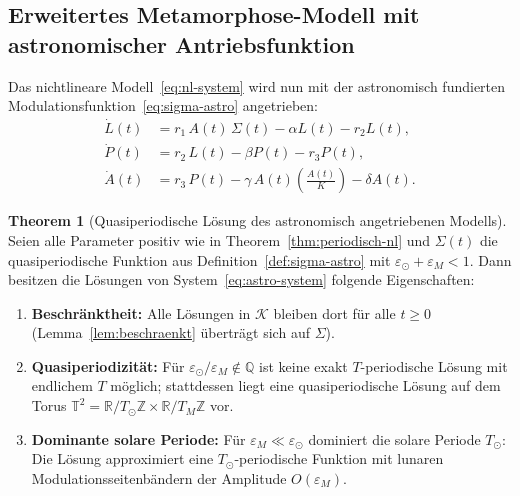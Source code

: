 ﻿\documentclass[12pt, a4paper]{article}
\theoremstyle{definition}
\newtheorem{theorem}{Theorem}[section]
\newcommand{\R}{\mathbb{R}}
\newcommand{\Z}{\mathbb{Z}}
\newcommand{\Q}{\mathbb{Q}}
\begin{document}
\subsection{Erweitertes Metamorphose-Modell mit astronomischer Antriebsfunktion}

Das nichtlineare Modell~\eqref{eq:nl-system} wird nun mit der astronomisch
fundierten Modulationsfunktion~\eqref{eq:sigma-astro} angetrieben:
\begin{subequations}\label{eq:astro-system}
\begin{align}
  \dot{L}(t) &= r_1\,A(t)\,\Sigma(t) - \alpha L(t) - r_2 L(t), \label{eq:astro-L}\\
  \dot{P}(t) &= r_2\,L(t) - \beta P(t) - r_3 P(t), \label{eq:astro-P}\\
  \dot{A}(t) &= r_3\,P(t) - \gamma\,A(t)\!\left(\frac{A(t)}{K}\right) - \delta A(t). \label{eq:astro-A}
\end{align}
\end{subequations}

\begin{theorem}[Quasiperiodische Lösung des astronomisch angetriebenen Modells]\label{thm:quasiperiodisch}
Seien alle Parameter positiv wie in Theorem~\ref{thm:periodisch-nl} und
$\Sigma(t)$ die quasiperiodische Funktion aus Definition~\ref{def:sigma-astro}
mit $\varepsilon_{\odot} + \varepsilon_M < 1$. Dann besitzen die Lösungen von
System~\eqref{eq:astro-system} folgende Eigenschaften:
\begin{enumerate}
  \item \textbf{Beschränktheit:} Alle Lösungen in $\mathcal{K}$ bleiben dort für
        alle $t \geq 0$ (Lemma~\ref{lem:beschraenkt} überträgt sich auf $\Sigma$).
  \item \textbf{Quasiperiodizität:} Für $\varepsilon_{\odot}/\varepsilon_M \notin \Q$
        ist keine exakt $T$-periodische Lösung mit endlichem $T$ möglich;
        stattdessen liegt eine quasiperiodische Lösung auf dem Torus
        $\mathbb{T}^2 = \R/T_{\odot}\Z \times \R/T_M\Z$ vor.
  \item \textbf{Dominante solare Periode:} Für $\varepsilon_M \ll \varepsilon_{\odot}$
        dominiert die solare Periode $T_{\odot}$: Die Lösung approximiert eine
        $T_{\odot}$-periodische Funktion mit lunaren Modulationsseitenbändern der
        Amplitude $O(\varepsilon_M)$.
\end{enumerate}
\end{theorem}
\end{document}
